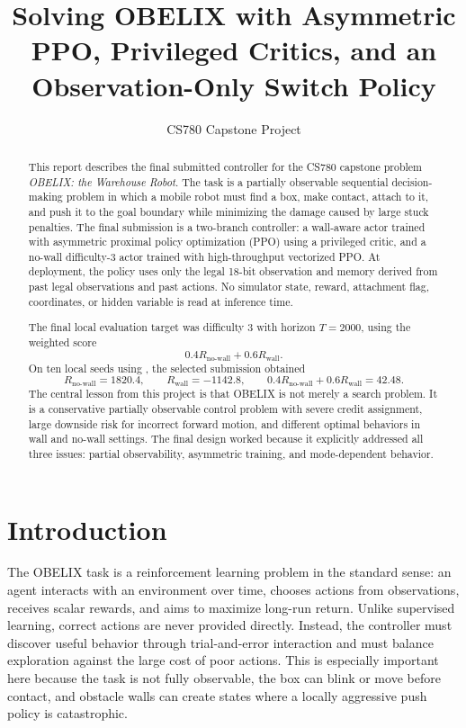 \documentclass[11pt]{article}
\title{\textbf{Solving OBELIX with Asymmetric PPO, Privileged Critics, and an Observation-Only Switch Policy}}
\author{CS780 Capstone Project}
\date{}
\begin{document}
\maketitle

\begin{abstract}
This report describes the final submitted controller for the CS780 capstone problem
\emph{OBELIX: the Warehouse Robot}. The task is a partially observable sequential
decision-making problem in which a mobile robot must find a box, make contact,
attach to it, and push it to the goal boundary while minimizing the damage caused by
large stuck penalties. The final submission is a two-branch controller: a wall-aware
actor trained with asymmetric proximal policy optimization (PPO) using a privileged
critic, and a no-wall difficulty-3 actor trained with high-throughput vectorized PPO.
At deployment, the policy uses only the legal 18-bit observation and memory derived
from past legal observations and past actions. No simulator state, reward, attachment
flag, coordinates, or hidden variable is read at inference time.

The final local evaluation target was difficulty 3 with horizon \(T=2000\), using the
weighted score
\[
  0.4 R_{\text{no-wall}} + 0.6 R_{\text{wall}}.
\]
On ten local seeds using , the selected submission obtained
\[
  R_{\text{no-wall}} = 1820.4,
  \qquad
  R_{\text{wall}} = -1142.8,
  \qquad
  0.4R_{\text{no-wall}} + 0.6R_{\text{wall}} = 42.48.
\]
The central lesson from this project is that OBELIX is not merely a search problem. It
is a conservative partially observable control problem with severe credit assignment,
large downside risk for incorrect forward motion, and different optimal behaviors in
wall and no-wall settings. The final design worked because it explicitly addressed all
three issues: partial observability, asymmetric training, and mode-dependent behavior.
\end{abstract}

\section{Introduction}

The OBELIX task is a reinforcement learning problem in the standard sense: an agent
interacts with an environment over time, chooses actions from observations, receives
scalar rewards, and aims to maximize long-run return. Unlike supervised learning,
correct actions are never provided directly. Instead, the controller must discover useful
behavior through trial-and-error interaction and must balance exploration against the
large cost of poor actions. This is especially important here because the task is not fully
observable, the box can blink or move before contact, and obstacle walls can create
states where a locally aggressive push policy is catastrophic.
\end{document}
